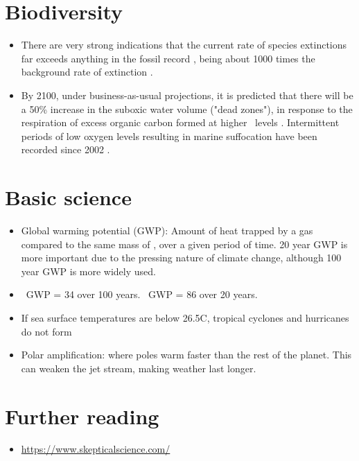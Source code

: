 \documentclass[11pt]{article}
\begin{document}
\section{Biodiversity}
\begin{itemize}
\item There are very strong indications that the current rate of species extinctions far exceeds anything in the fossil record \cite{Magurran10}, being about 1000 times the background rate of extinction \cite{Pimm14}. 
\item By 2100, under business-as-usual projections, it is predicted that there will be a 50\% increase in the suboxic water volume ("dead zones"), in response to the respiration of excess organic carbon formed at higher \cotwo\ levels \cite{Oschlies08}. Intermittent periods of low oxygen levels resulting in marine suffocation have been recorded since 2002 \cite{Welch15}.
\end{itemize}

\section{Basic science}

\begin{itemize}
\item Global warming potential (GWP): Amount of heat trapped by a gas compared to the same mass of \cotwo, over a given period of time. 20 year GWP is more important due to the pressing nature of climate change, although 100 year GWP is more widely used.
\item \meth\ GWP = 34 over 100 years. \meth\ GWP = 86 over 20 years. 
\item If sea surface temperatures are below 26.5\textdegree{}C, tropical cyclones and hurricanes do not form
\item Polar amplification: where poles warm faster than the rest of the planet. This can weaken the jet stream, making weather last longer. 
\end{itemize}

\section{Further reading}
\begin{itemize}
\item \url{https://www.skepticalscience.com/}
\end{itemize}


\small{}
\end{document}
